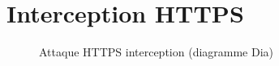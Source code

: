 \chapter{Interception HTTPS}

\begin{figure}[H]
  \caption{Attaque HTTPS interception (diagramme Dia)}
\end{figure}
